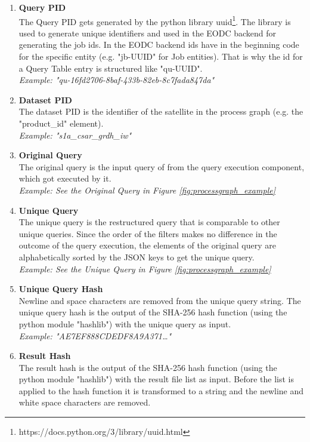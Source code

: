 \documentclass[draft,final]{vutinfth} %
\begin{document}
\begin{enumerate}
	\item \textbf{Query PID} \\
	The Query PID gets generated by the python library uuid\footnote{https://docs.python.org/3/library/uuid.html}. The library is used to generate unique identifiers and used in the EODC backend for generating the job ids. In the EODC backend ids have in the beginning code for the specific entity (e.g. "jb-UUID" for Job entities). That is why the id for a Query Table entry is structured like "qu-UUID". \\
	\textit{Example: "qu-16fd2706-8baf-433b-82eb-8c7fada847da"}
	\item \textbf{Dataset PID} \\
	The dataset PID is the identifier of the satellite in the process graph (e.g. the "product\_id" element). \\
	\textit{Example: "s1a\_csar\_grdh\_iw"}	    	
	\item\textbf{Original Query} \\
	The original query is the input query of from the query execution component, which got executed by it.  \\ 
	\textit{Example: See the Original Query in Figure \ref{fig:processgraph_example}}	 
	\item \textbf{Unique Query} \\
	The unique query is the restructured query that is comparable to other unique queries. Since the order of the filters makes no difference in the outcome of the query execution, the elements of the original query are alphabetically sorted by the JSON keys to get the unique query. \\
	\textit{Example: See the Unique Query in Figure \ref{fig:processgraph_example}}	  	 	
	\item \textbf{Unique Query Hash} \\ 
	Newline and space characters are removed from the unique query string. The unique query hash is the output of the SHA-256 hash function (using the python module "hashlib") with the unique query as input.  \\
	\textit{Example: "AE7EF888CDEDF8A9A371\dots"} 
	\item \textbf{Result Hash} \\
	The result hash is the output of the SHA-256 hash function (using the python module "hashlib") with the result file list as input. Before the list is applied to the hash function it is transformed to a string and the newline and white space characters are removed. \\

\end{enumerate}
\end{document}
